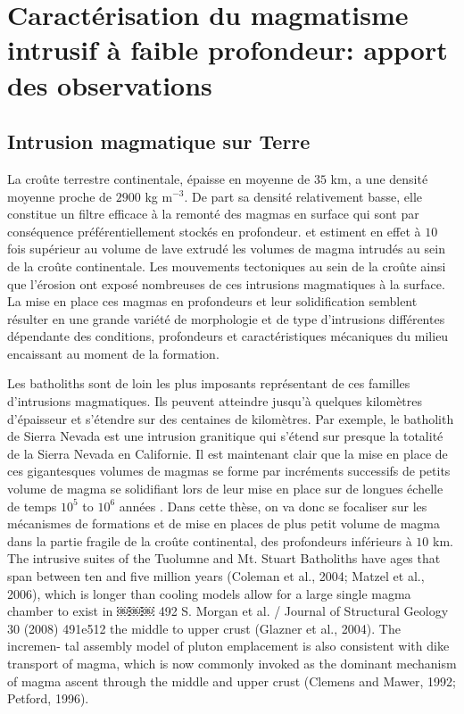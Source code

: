 \section{Caractérisation du  magmatisme intrusif à  faible profondeur:
  apport des observations}
\label{sec:zool-des-intr}

\subsection{Intrusion magmatique sur Terre}
\label{sec:definition}

La croûte terrestre continentale, épaisse en moyenne de $35$ km, a une
densité  moyenne proche  de $2900$  kg m$^{-3}$.   De part  sa densité
relativement basse, elle constitue un filtre efficace à la remonté des
magmas en surface qui  sont par conséquence préférentiellement stockés
en profondeur.  \citet{Crisp:1984dm}  et \citet{White:2006gr} estiment
en effet à  $10$ fois supérieur au volume de  lave extrudé les volumes
de magma intrudés  au sein de la croûte  continentale.  Les mouvements
tectoniques  au sein  de  la  croûte ainsi  que  l’érosion ont  exposé
nombreuses  de ces  intrusions magmatiques  à la  surface. La  mise en
place  ces  magmas  en  profondeurs et  leur  solidification  semblent
résulter en une grande variété  de morphologie et de type d'intrusions
différentes dépendante des conditions, profondeurs et caractéristiques
mécaniques du milieu encaissant au moment de la formation.

Les batholiths  sont de  loin les plus  imposants représentant  de ces
familles  d'intrusions  magmatiques.   Ils peuvent  atteindre  jusqu'à
quelques  kilomètres d'épaisseur  et  s'étendre sur  des centaines  de
kilomètres.   Par  exemple, le  batholith  de  Sierra Nevada  est  une
intrusion granitique qui s'étend sur  presque la totalité de la Sierra
Nevada en Californie.  Il est maintenant clair que la mise en place de
ces gigantesques volumes de magmas  se forme par incréments successifs
de petits  volume de magma se  solidifiant lors de leur  mise en place
sur   de  longues   échelle   de  temps   $10^5$   to  $10^6$   années
\citep{Petford:2000cc,Glazner:2004gv}. Dans cette thèse, on va donc se
focaliser sur  les mécanismes de  formations et  de mise en  places de
plus  petit volume  de  magma  dans la  partie  fragile  de la  croûte
continental, des profondeurs inférieurs à $10$ km. The intrusive suites of the Tuolumne and Mt. Stuart Batholiths have ages that span between ten and five million years (Coleman et al., 2004; Matzel et al., 2006), which is longer than cooling models allow for a large single magma chamber to exist in
￼￼￼
492 S. Morgan et al. / Journal of Structural Geology 30 (2008) 491e512
the middle  to upper crust (Glazner  et al., 2004). The  incremen- tal
assembly  model of  pluton emplacement  is also  consistent with  dike
transport  of magma,  which is  now commonly  invoked as  the dominant
mechanism of magma ascent through  the middle and upper crust (Clemens
and Mawer, 1992; Petford, 1996).

